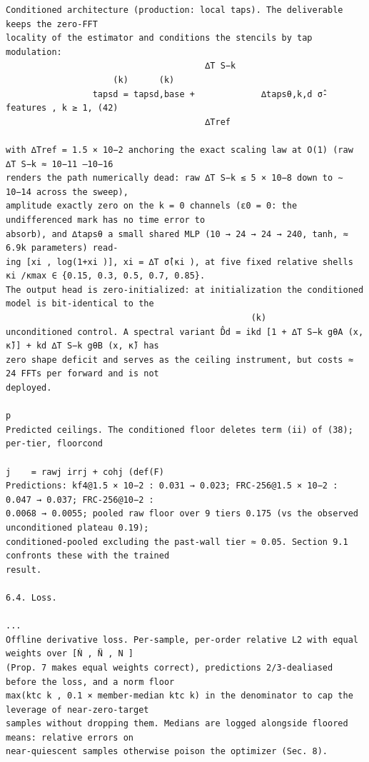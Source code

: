 \documentclass[letterpaper]{article}
\begin{document}
\begin{Verbatim}[fontsize=\fontsize{6.35}{7.15}\selectfont,breaklines=false]
Conditioned architecture (production: local taps). The deliverable keeps the zero-FFT
locality of the estimator and conditions the stencils by tap modulation:
                                       ∆T S−k                         
                     (k)      (k)
                 tapsd = tapsd,base +             ∆tapsθ,k,d σ̂-features , k ≥ 1, (42)
                                       ∆Tref

with ∆Tref = 1.5 × 10−2 anchoring the exact scaling law at O(1) (raw ∆T S−k ≈ 10−11 –10−16
renders the path numerically dead: raw ∆T S−k ≲ 5 × 10−8 down to ∼ 10−14 across the sweep),
amplitude exactly zero on the k = 0 channels (ε0 = 0: the undifferenced mark has no time error to
absorb), and ∆tapsθ a small shared MLP (10 → 24 → 24 → 240, tanh, ≈ 6.9k parameters) read-
ing [xi , log(1+xi )], xi = ∆T σ̂(κi ), at five fixed relative shells κi /κmax ∈ {0.15, 0.3, 0.5, 0.7, 0.85}.
The output head is zero-initialized: at initialization the conditioned model is bit-identical to the
                                                (k)
unconditioned control. A spectral variant D̂d = ikd [1 + ∆T S−k gθA (x, κ̃)] + kd ∆T S−k gθB (x, κ̃) has
zero shape deficit and serves as the ceiling instrument, but costs ≈ 24 FFTs per forward and is not
deployed.
                                                                                               p
Predicted ceilings. The conditioned floor deletes term (ii) of (38); per-tier, floorcond
                                                                                   j    = rawj irrj + cohj (def(F)
Predictions: kf4@1.5 × 10−2 : 0.031 → 0.023; FRC-256@1.5 × 10−2 : 0.047 → 0.037; FRC-256@10−2 :
0.0068 → 0.0055; pooled raw floor over 9 tiers 0.175 (vs the observed unconditioned plateau 0.19);
conditioned-pooled excluding the past-wall tier ≈ 0.05. Section 9.1 confronts these with the trained
result.

6.4. Loss.
                                                                                               ...
Offline derivative loss. Per-sample, per-order relative L2 with equal weights over [Ṅ , N̈ , N ]
(Prop. 7 makes equal weights correct), predictions 2/3-dealiased before the loss, and a norm floor
max(ktc k , 0.1 × member-median ktc k) in the denominator to cap the leverage of near-zero-target
samples without dropping them. Medians are logged alongside floored means: relative errors on
near-quiescent samples otherwise poison the optimizer (Sec. 8).


\end{Verbatim}
\end{document}
